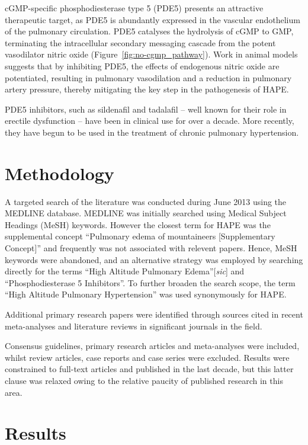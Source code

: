 \documentclass[10pt,a4paper]{article}
\begin{document}
cGMP-specific phosphodiesterase type 5 (PDE5) presents an attractive therapeutic target, as PDE5 is abundantly expressed in the vascular endothelium of the pulmonary circulation.\cite{Ahn:1991vt} PDE5 catalyses the hydrolysis of cGMP to GMP, terminating the intracellular secondary messaging cascade from the potent vasodilator nitric oxide (Figure~\ref{fig:no-cgmp_pathway}).\cite{Archer:2009cx} Work in animal models suggests that by inhibiting PDE5, the effects of endogenous nitric oxide are potentiated, resulting in pulmonary vasodilation and a reduction in pulmonary artery pressure, thereby mitigating the key step in the pathogenesis of HAPE.\cite{Zhao:2001kj}

PDE5 inhibitors, such as sildenafil and tadalafil -- well known for their role in erectile dysfunction -- have been in clinical use for over a decade. More recently, they have begun to be used in the treatment of chronic pulmonary hypertension.\cite{NationalPulmonaryHypertensionCentresoftheUKandIreland:2008jh}

\section*{Methodology}

A targeted search of the literature was conducted during June 2013 using the MEDLINE database. MEDLINE was initially searched using Medical Subject Headings (MeSH) keywords. However the closest term for HAPE was the supplemental concept ``Pulmonary edema of mountaineers [Supplementary Concept]'' and frequently was not associated with relevent papers. Hence, MeSH keywords were abandoned, and an alternative strategy was employed by searching directly for the terms ``High Altitude Pulmonary Edema''[\emph{sic}] and ``Phosphodiesterase 5 Inhibitors''. To further broaden the search scope, the term ``High Altitude Pulmonary Hypertension'' was used synonymously for HAPE.

Additional primary research papers were identified through sources cited in recent meta-analyses and literature reviews in significant journals in the field.

Consensus guidelines, primary research articles and meta-analyses were included, whilst review articles, case reports and case series were excluded. Results were constrained to full-text articles and published in the last decade, but this latter clause was relaxed owing to the relative paucity of published research in this area.

\section*{Results}
\end{document}
